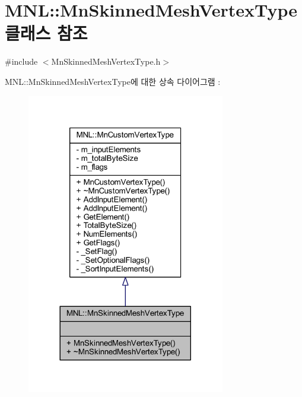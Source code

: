 \hypertarget{class_m_n_l_1_1_mn_skinned_mesh_vertex_type}{}\section{M\+NL\+:\+:Mn\+Skinned\+Mesh\+Vertex\+Type 클래스 참조}
\label{class_m_n_l_1_1_mn_skinned_mesh_vertex_type}


{\ttfamily \#include $<$Mn\+Skinned\+Mesh\+Vertex\+Type.\+h$>$}



M\+NL\+:\+:Mn\+Skinned\+Mesh\+Vertex\+Type에 대한 상속 다이어그램 \+: \nopagebreak
\begin{figure}[H]
\begin{center}
\leavevmode
\includegraphics[width=245pt]{class_m_n_l_1_1_mn_skinned_mesh_vertex_type__inherit__graph}
\end{center}
\end{figure}


